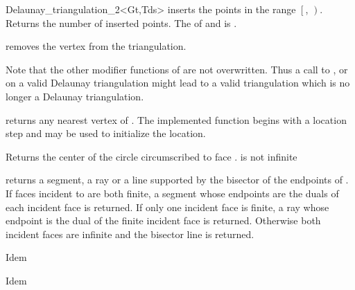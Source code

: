 \begin{ccClassTemplate} {Delaunay_triangulation_2<Gt,Tds>}
{inserts the points in the range
 $\left[\right.$, $\left.\right)$.
 Returns the number of inserted points.
 \ccPrecond The  of  and 
 is .}

%
%

{removes the vertex from the triangulation.}

Note that the other modifier functions  of
 are not overwritten.
Thus a  call to 
,  or 
on a valid Delaunay triangulation might lead to a valid triangulation
which is no longer a Delaunay triangulation.


{returns any nearest vertex of . The implemented function
begins with a location step and
 may be used to initialize the location.}





{Returns the center of the circle circumscribed to face .
\ccPrecond {} is not infinite}

{returns a segment, a ray or a line supported by the bisector of the
endpoints of .
If faces incident to  are both finite, a segment whose endpoints are the
duals of each incident face is returned. If only one incident face is
finite, a
ray whose endpoint is the dual of the finite incident face is returned.
Otherwise both incident faces
are infinite and the bisector line is returned.}

{Idem}

{Idem}




\end{ccClassTemplate}
